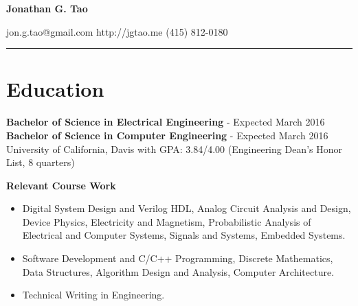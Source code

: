 \documentclass[10pt]{article}
\begin{document}
\noindent\begin{minipage}[t]{0.5\textwidth}
\huge \textbf{Jonathan G. Tao}
\end{minipage}
\begin{minipage}[b]{0.5\textwidth}
\small
\flushright
jon.g.tao@gmail.com\hspace{16pt}
http://jgtao.me\hspace{16pt}
(415) 812-0180
\end{minipage}
\noindent\rule{\linewidth}{0.05mm}

\section{Education}
\begin{adjustwidth}{16pt}{0pt}
\noindent\textbf{Bachelor of Science in Electrical Engineering}
 - Expected March 2016\\
\noindent\textbf{Bachelor of Science in Computer Engineering}
 - Expected March 2016\\
University of California, Davis \hspace{4pt} with \hspace{4pt}  GPA: 3.84/4.00
(Engineering Dean's Honor List, 8 quarters)

\vspace{8pt}
\noindent\textbf{Relevant Course Work}
\begin{itemize}
	\setlength\itemsep{0pt}
	\item Digital System Design and Verilog HDL, Analog Circuit Analysis and
	Design, Device Physics, Electricity and Magnetism, Probabilistic Analysis of
	Electrical and Computer Systems, Signals and Systems, Embedded Systems.
	\item Software Development and C/C++ Programming, Discrete Mathematics, Data
	Structures, Algorithm Design and Analysis, Computer Architecture.
	\item Technical Writing in Engineering.
\end{itemize}
\end{adjustwidth}
\end{document}
